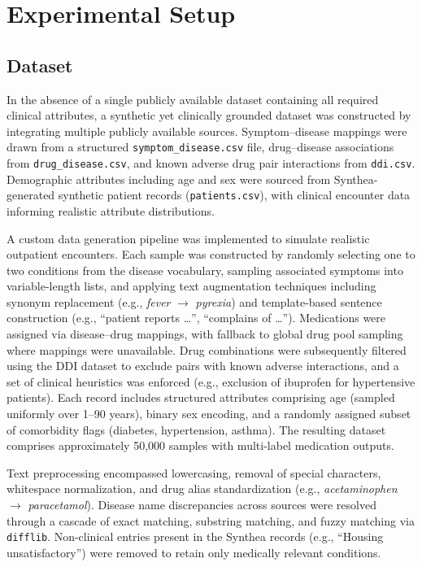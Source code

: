 \section{Experimental Setup}

\subsection{Dataset}
In the absence of a single publicly available dataset containing all required clinical attributes, a synthetic yet clinically grounded dataset was constructed by integrating multiple publicly available sources. Symptom--disease mappings were drawn from a structured \texttt{symptom\_disease.csv} file, drug--disease associations from \texttt{drug\_disease.csv}, and known adverse drug pair interactions from \texttt{ddi.csv}. Demographic attributes including age and sex were sourced from Synthea-generated synthetic patient records (\texttt{patients.csv}), with clinical encounter data informing realistic attribute distributions.

A custom data generation pipeline was implemented to simulate realistic outpatient encounters. Each sample was constructed by randomly selecting one to two conditions from the disease vocabulary, sampling associated symptoms into variable-length lists, and applying text augmentation techniques including synonym replacement (e.g., \textit{fever} $\rightarrow$ \textit{pyrexia}) and template-based sentence construction (e.g., ``patient reports \ldots'', ``complains of \ldots''). Medications were assigned via disease--drug mappings, with fallback to global drug pool sampling where mappings were unavailable. Drug combinations were subsequently filtered using the DDI dataset to exclude pairs with known adverse interactions, and a set of clinical heuristics was enforced (e.g., exclusion of ibuprofen for hypertensive patients). Each record includes structured attributes comprising age (sampled uniformly over 1--90 years), binary sex encoding, and a randomly assigned subset of comorbidity flags (diabetes, hypertension, asthma). The resulting dataset comprises approximately 50,000 samples with multi-label medication outputs.

Text preprocessing encompassed lowercasing, removal of special characters, whitespace normalization, and drug alias standardization (e.g., \textit{acetaminophen} $\rightarrow$ \textit{paracetamol}). Disease name discrepancies across sources were resolved through a cascade of exact matching, substring matching, and fuzzy matching via \texttt{difflib}. Non-clinical entries present in the Synthea records (e.g., ``Housing unsatisfactory'') were removed to retain only medically relevant conditions.

